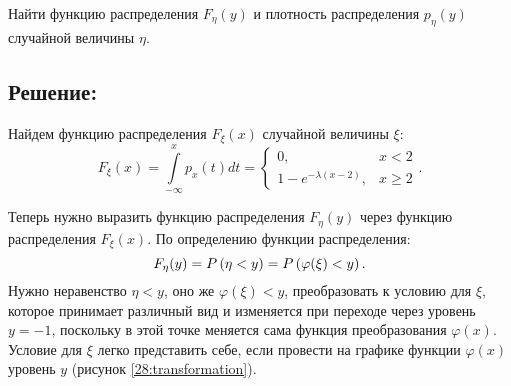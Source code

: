 \documentclass[12pt]{article}
\begin{document}
    Найти функцию распределения $F_\eta(y)$ и плотность распределения $p_\eta(y)$ случайной величины $\eta$.

    \subsection*{Решение:}
    Найдем функцию распределения $F_\xi(x)$ случайной величины $\xi$:
    \[
        F_\xi(x)
        = \int \limits_{-\infty}^x p_x(t) dt
        = \left \{
        \begin{array}{ll}
            0,                         & x < 2   \\
            1 - e^{- \lambda (x - 2)}, & x \ge 2
        \end{array}
        \right .
        .
    \]

    Теперь нужно выразить функцию распределения $F_\eta(y)$ через функцию распределения $F_\xi(x)$. По определению функции распределения:
    \[
        F_\eta(y)
        = P \left ( \eta < y \right )
        = P \left ( \varphi(\xi) < y \right ).
    \]
    Нужно неравенство $\eta < y$, оно же $\varphi(\xi) < y$, преобразовать к условию для $\xi$, которое принимает различный вид и изменяется при переходе через уровень $y=-1$, поскольку
    в этой точке меняется сама функция преобразования $\varphi(x)$. Условие для $\xi$ легко представить себе, если провести на графике функции $\varphi(x)$ уровень $y$ (рисунок
    \ref{28:transformation}).
\end{document}
